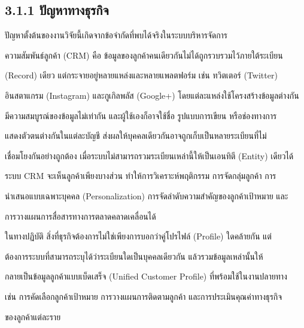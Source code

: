 \documentclass[12pt,a4paper]{report}
\begin{document}
\subsection*{3.1.1 ปัญหาทางธุรกิจ}
ปัญหาตั้งต้นของงานวิจัยนี้เกิดจากข้อจำกัดที่พบได้จริงในระบบบริหารจัดการ\par
ความสัมพันธ์ลูกค้า (CRM) คือ ข้อมูลของลูกค้าคนเดียวกันไม่ได้ถูกรวบรวมไว้ภายใต้ระเบียน\par
(Record) เดียว แต่กระจายอยู่หลายแหล่งและหลายแพลตฟอร์ม เช่น ทวิตเตอร์ (Twitter)\par
อินสตาแกรม (Instagram) และกูเกิลพลัส (Google+) โดยแต่ละแหล่งใช้โครงสร้างข้อมูลต่างกัน\par
มีความสมบูรณ์ของข้อมูลไม่เท่ากัน และผู้ใช้เองก็อาจใช้ชื่อ รูปแบบการเขียน หรือช่องทางการ\par
แสดงตัวตนต่างกันในแต่ละบัญชี ส่งผลให้บุคคลเดียวกันอาจถูกเก็บเป็นหลายระเบียนที่ไม่\par
เชื่อมโยงกันอย่างถูกต้อง เมื่อระบบไม่สามารถรวมระเบียนเหล่านี้ให้เป็นเอนทิตี (Entity) เดียวได้\par
ระบบ CRM จะเห็นลูกค้าเพียงบางส่วน ทำให้การวิเคราะห์พฤติกรรม การจัดกลุ่มลูกค้า การ\par
นำเสนอแบบเฉพาะบุคคล (Personalization) การจัดลำดับความสำคัญของลูกค้าเป้าหมาย และ\par
การวางแผนการสื่อสารทางการตลาดคลาดเคลื่อนได้\par
ในทางปฏิบัติ สิ่งที่ธุรกิจต้องการไม่ใช่เพียงการบอกว่าคู่โปรไฟล์ (Profile) ใดคล้ายกัน แต่\par
ต้องการระบบที่สามารถระบุได้ว่าระเบียนใดเป็นบุคคลเดียวกัน แล้วรวมข้อมูลเหล่านั้นให้\par
กลายเป็นข้อมูลลูกค้าแบบเบ็ดเสร็จ (Unified Customer Profile) ที่พร้อมใช้ในงานปลายทาง\par
เช่น การคัดเลือกลูกค้าเป้าหมาย การวางแผนการติดตามลูกค้า และการประเมินคุณค่าทางธุรกิจ\par
ของลูกค้าแต่ละราย\par
\end{document}
